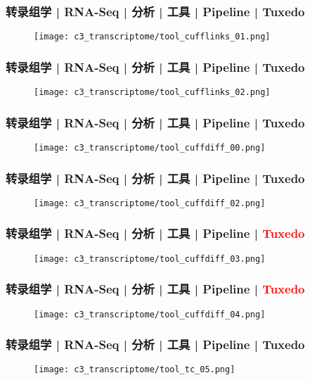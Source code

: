 \begin{frame}
  \frametitle{转录组学 | RNA-Seq | 分析 | 工具 | Pipeline | Tuxedo}
  \begin{figure}
    \centering
    \texttt{[image: c3\_transcriptome/tool\_cufflinks\_01.png]}
  \end{figure}
\end{frame}

\begin{frame}
  \frametitle{转录组学 | RNA-Seq | 分析 | 工具 | Pipeline | Tuxedo}
  \begin{figure}
    \centering
    \texttt{[image: c3\_transcriptome/tool\_cufflinks\_02.png]}
  \end{figure}
\end{frame}

\begin{frame}
  \frametitle{转录组学 | RNA-Seq | 分析 | 工具 | Pipeline | Tuxedo}
  \begin{figure}
    \centering
    \texttt{[image: c3\_transcriptome/tool\_cuffdiff\_00.png]}
  \end{figure}
\end{frame}

\begin{frame}
  \frametitle{转录组学 | RNA-Seq | 分析 | 工具 | Pipeline | Tuxedo}
  \begin{figure}
    \centering
    \texttt{[image: c3\_transcriptome/tool\_cuffdiff\_02.png]}
  \end{figure}
\end{frame}

\begin{frame}
  \frametitle{转录组学 | RNA-Seq | 分析 | 工具 | Pipeline | \textcolor{red}{Tuxedo}}
  \begin{figure}
    \centering
    \texttt{[image: c3\_transcriptome/tool\_cuffdiff\_03.png]}
  \end{figure}
\end{frame}

\begin{frame}
  \frametitle{转录组学 | RNA-Seq | 分析 | 工具 | Pipeline | \textcolor{red}{Tuxedo}}
  \begin{figure}
    \centering
    \texttt{[image: c3\_transcriptome/tool\_cuffdiff\_04.png]}
  \end{figure}
\end{frame}

\begin{frame}
  \frametitle{转录组学 | RNA-Seq | 分析 | 工具 | Pipeline | Tuxedo}
  \begin{figure}
    \centering
    \texttt{[image: c3\_transcriptome/tool\_tc\_05.png]}
  \end{figure}
\end{frame}

